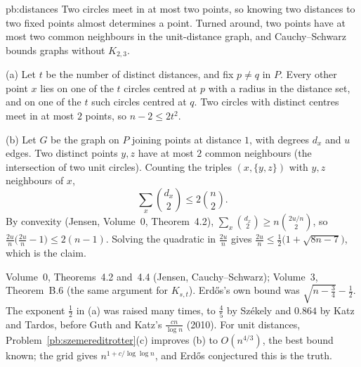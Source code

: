 \begin{solution}{pb:distances}
\idea Two circles meet in at most two points, so knowing two distances to two fixed points almost determines a point. Turned
around, two points have at most two common neighbours in the unit-distance graph, and Cauchy--Schwarz bounds graphs without
$K_{2,3}$.

\writeup (a) Let $t$ be the number of distinct distances, and fix $p\ne q$ in $P$. Every other point $x$ lies on one of the $t$ circles
centred at $p$ with a radius in the distance set, and on one of the $t$ such circles centred at $q$. Two circles with distinct
centres meet in at most $2$ points, so $n-2\le2t^2$.

(b) Let $G$ be the graph on $P$ joining points at distance $1$, with degrees $d_x$ and $u$ edges. Two distinct points $y,z$ have at
most $2$ common neighbours (the intersection of two unit circles). Counting the triples $(x,\{y,z\})$ with $y,z$ neighbours of $x$,
\[
\sum_x\binom{d_x}2\le2\binom n2.
\]
By convexity (Jensen, Volume~0, Theorem~4.2), $\sum_x\binom{d_x}2\ge n\binom{2u/n}2$, so $\frac{2u}n\bigl(\frac{2u}n-1\bigr)\le2(n-1)$. Solving the
quadratic in $\frac{2u}n$ gives $\frac{2u}n\le\frac12\bigl(1+\sqrt{8n-7}\bigr)$, which is the claim.

\tools Volume~0, Theorems~4.2 and~4.4 (Jensen, Cauchy--Schwarz); Volume~3, Theorem~B.6 (the same argument for $K_{s,t}$).
\leads Erdős's own bound was $\sqrt{n-\frac34}-\frac12$. The exponent $\frac12$ in (a) was raised many times, to $\frac45$ by Székely and
$0.864$ by Katz and Tardos, before Guth and Katz's $\frac{cn}{\log n}$ (2010). For unit distances, Problem~\ref{pb:szemereditrotter}(c)
improves (b) to $O(n^{4/3})$, the best bound known; the grid gives $n^{1+c/\log\log n}$, and Erdős conjectured this is the truth.
\end{solution}

